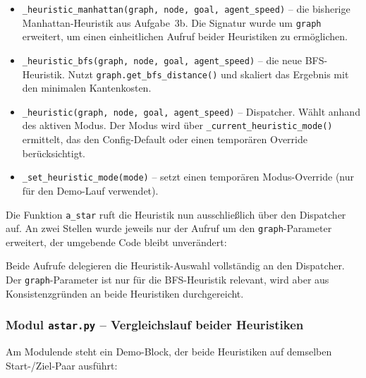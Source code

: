 \begin{itemize}
    \item \texttt{\_heuristic\_manhattan(graph, node, goal, agent\_speed)} -- die bisherige Manhattan-Heuristik aus Aufgabe~3b. Die Signatur wurde um \texttt{graph} erweitert, um einen einheitlichen Aufruf beider Heuristiken zu ermöglichen.
    \item \texttt{\_heuristic\_bfs(graph, node, goal, agent\_speed)} -- die neue \acs{BFS}-Heuristik. Nutzt \texttt{graph.get\_bfs\_distance()} und skaliert das Ergebnis mit den minimalen Kantenkosten.
    \item \texttt{\_heuristic(graph, node, goal, agent\_speed)} -- Dispatcher. Wählt anhand des aktiven Modus. Der Modus wird über \texttt{\_current\_heuristic\_mode()} ermittelt, das den Config-Default oder einen temporären Override berücksichtigt.
    \item \texttt{\_set\_heuristic\_mode(mode)} -- setzt einen temporären Modus-Override (nur für den Demo-Lauf verwendet).
\end{itemize}

Die Funktion \texttt{a\_star} ruft die Heuristik nun ausschließlich über den Dispatcher auf. An zwei Stellen wurde jeweils nur der Aufruf um den \texttt{graph}-Parameter erweitert, der umgebende Code bleibt unverändert:





Beide Aufrufe delegieren die Heuristik-Auswahl vollständig an den Dispatcher. Der \texttt{graph}-Parameter ist nur für die \acs{BFS}-Heuristik relevant, wird aber aus Konsistenzgründen an beide Heuristiken durchgereicht.


\subsubsection{Modul \texttt{astar.py} – Vergleichslauf beider Heuristiken}

Am Modulende steht ein Demo-Block, der beide Heuristiken auf demselben Start-/Ziel-Paar ausführt:

